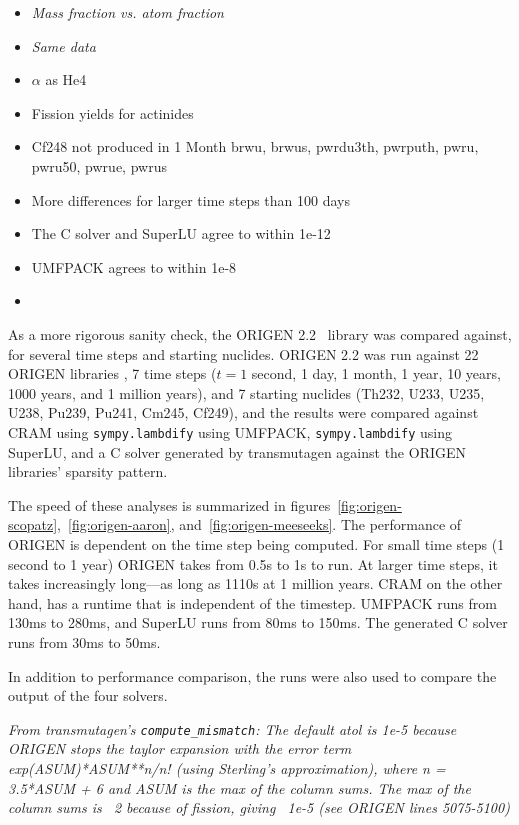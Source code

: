 \begin{itemize}
\item \it{Mass fraction vs. atom fraction}
\item {\it Same data}
\item $\alpha$ as He4
\item Fission yields for actinides
\item Cf248 not produced in 1 Month brwu, brwus, pwrdu3th, pwrputh, pwru,
  pwru50, pwrue, pwrus
\item More differences for larger time steps than 100 days
\item The C solver and SuperLU agree to within 1e-12
\item UMFPACK agrees to within 1e-8
\item {}
\end{itemize}

As a more rigorous sanity check, the ORIGEN 2.2~\cite{ationneeded} library was
compared against, for several time steps and starting nuclides. ORIGEN 2.2 was
run against 22 ORIGEN libraries , 7 time steps
($t= 1$ second, 1 day, 1 month, 1 year, 10 years, 1000 years, and 1 million
years), and 7 starting nuclides (Th232, U233, U235, U238, Pu239, Pu241, Cm245,
Cf249), and the results were compared against CRAM using
\texttt{sympy.\allowbreak{}lambdify} using UMFPACK,
\texttt{sympy.\allowbreak{}lambdify} using SuperLU, and a C solver generated
by transmutagen against the ORIGEN libraries' sparsity pattern.

 The speed of these analyses is summarized in
figures~\ref{fig:origen-scopatz},~\ref{fig:origen-aaron},
and~\ref{fig:origen-meeseeks}. The performance of ORIGEN is dependent on the
time step being computed. For small time steps (1 second to 1 year) ORIGEN
takes from 0.5\;s to 1\;s to run. At larger time steps, it takes increasingly
long---as long as 1110\;s at 1 million years. CRAM on the other hand, has a
runtime that is independent of the timestep. UMFPACK runs from 130\;ms to
280\;ms, and SuperLU runs from 80\;ms to 150\;ms. The generated C solver runs
from 30\;ms to 50\;ms. 

In addition to performance comparison, the runs were also used to compare the
output of the four solvers.

\it{From transmutagen's \texttt{compute\_mismatch}:}
The default atol is 1e-5 because ORIGEN stops the taylor expansion with
the error term exp(ASUM)*ASUM**n/n! (using Sterling's approximation),
where n = 3.5*ASUM + 6 and ASUM is the max of the column sums. The max of
the column sums is ~2 because of fission, giving ~1e-5 (see ORIGEN lines
5075-5100)

